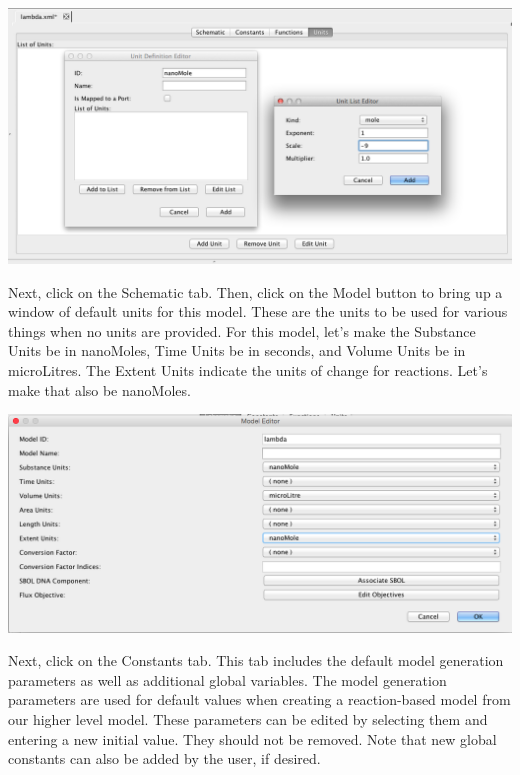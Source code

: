 \documentclass[titlepage,11pt]{article}
\begin{document}
\begin{center}
\includegraphics[width=160mm]{screenshots/units}
\end{center}

Next, click on the Schematic tab.  Then, click on the Model button to bring up a window of default units for this model.  These are the units to be used for various things when no units are provided.  For this model, let's make the Substance Units be in nanoMoles, Time Units be in seconds, and Volume Units be in microLitres.  The Extent Units indicate the units of change for reactions.  Let's make that also be nanoMoles.

\begin{center}
\includegraphics[width=160mm]{screenshots/ModelUnits}
\end{center}

Next, click on the Constants tab.  This tab includes the default model generation parameters as well as additional global variables.  The model generation parameters are used for default values when creating a reaction-based model from our higher level model.  These parameters can be edited by selecting them and entering a new initial value.  They should not be removed.  Note that new global constants can also be added by the user, if desired.
\end{document}
